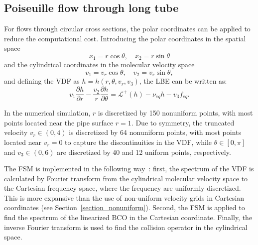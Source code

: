 

\subsection{Poiseuille flow through long tube}

For flows through circular cross sections, the polar coordinates  can be applied to reduce the computational cost. Introducing the polar coordinates in the spatial space
\begin{equation}
x_1=r\cos\theta, \quad
x_2=r\sin\theta
\end{equation} 
and the cylindrical coordinates in the molecular velocity space
\begin{equation}
v_1=v_r\cos\theta,  \quad
v_2=v_r\sin\theta,
\end{equation}  
and defining the VDF as $h=h(r,\theta,v_r,v_3)$, the LBE can be written as:
\begin{equation}\label{polar}
v_1\frac{\partial h}{\partial r}-\frac{v_2}{r}\frac{\partial h}{\partial \theta}=\mathcal{L}^+(h)-\nu_{eq}{h} -v_3f_{eq}. 
\end{equation}




In the numerical simulation, $r$ is discretized by 150 nonuniform points, with most points located near the pipe surface $r=1$. Due to symmetry, the truncated velocity $v_r\in(0,4)$ is discretized by 64 nonuniform points, with most points located near $v_r=0$ to capture the discontinuities in the VDF, while $\theta\in[0,\pi]$ and $v_3\in(0,6)$ are discretized by 40 and 12 uniform points, respectively. 

The FSM is implemented in the following way~\cite{LeiJCP2017}: first, the spectrum of the VDF is calculated by Fourier transform from the cylindrical molecular velocity space to the Cartesian frequency space, where the frequency are uniformly discretized. This is more expansive than the use of non-uniform velocity grids in Cartesian coordinates (see Section~\ref{section_nonuniform}). Second, the FSM is applied to find the spectrum of the linearized BCO in the Cartesian coordinate. Finally, the inverse Fourier transform is used to find the collision operator in the cylindrical space. 

